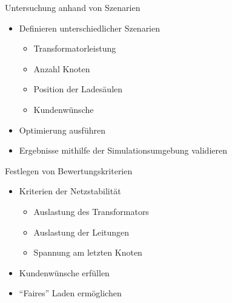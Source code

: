 \documentclass[aspectratio=169]{beamer}
\begin{document}
\begin{frame}{Untersuchung anhand von Szenarien}
	\begin{itemize}
		\item Definieren unterschiedlicher Szenarien
		\begin{itemize}
			\item Transformatorleistung
			\item Anzahl Knoten
			\item Position der Ladesäulen
			\item Kundenwünsche
		\end{itemize}
		\item Optimierung ausführen
		\item Ergebnisse mithilfe der Simulationsumgebung validieren
	\end{itemize}
\end{frame}


\begin{frame}{Festlegen von Bewertungskriterien}
	\begin{itemize}
		\item Kriterien der Netzstabilität
		\begin{itemize}
			\item Auslastung des Transformators
			\item Auslastung der Leitungen
			\item Spannung am letzten Knoten
		\end{itemize}
		\item Kundenwünsche erfüllen
		\item \enquote{Faires} Laden ermöglichen
	\end{itemize}
\end{frame}
\end{document}
